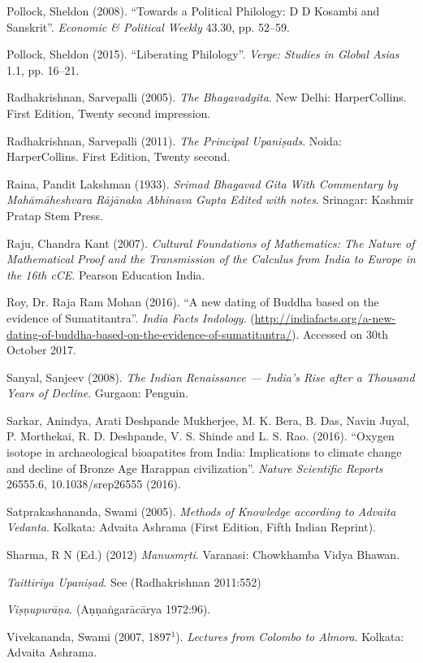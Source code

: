 \begin{thebibliography}{99}
Pollock, Sheldon (2008). ``Towards a Political Philology: D D Kosambi and Sanskrit''. {\sl Economic \& Political Weekly} 43.30, pp. 52--59.

Pollock, Sheldon  (2015). ``Liberating Philology''. {\sl Verge: Studies in Global Asias} 1.1, pp. 16--21.

Radhakrishnan, Sarvepalli (2005). {\sl The Bhagavadgita}. New Delhi: HarperCollins. First Edition, Twenty second impression.

Radhakrishnan, Sarvepalli (2011). {\sl The Principal Upaniṣads}. Noida: HarperCollins. First Edition, Twenty second.

Raina, Pandit Lakshman (1933). {\sl Srimad Bhagavad Gita With Commentary by Mahāmāheshvara Rājānaka Abhinava Gupta Edited with notes}. Srinagar: Kashmir Pratap Stem Press.

Raju, Chandra Kant (2007). {\sl Cultural Foundations of Mathematics: The Nature of Mathematical Proof and the Transmission of the Calculus from India to Europe in the 16th cCE}. Pearson Education India.

Roy, Dr. Raja Ram Mohan (2016). ``A new dating of Buddha based on the evidence of Sumatitantra''. {\sl India Facts Indology}.
(\url{http://indiafacts.org/a-new-dating-of-buddha-based-on-the-evidence-of-sumatitantra/}). Accessed on 30th October 2017. 

Sanyal, Sanjeev (2008). {\sl The Indian Renaissance --- India's Rise after a Thousand Years of Decline}. Gurgaon: Penguin.

Sarkar, Anindya, Arati Deshpande Mukherjee, M. K. Bera, B. Das, Navin Juyal, P. Morthekai, R. D. Deshpande, V. S. Shinde and L. S. Rao. (2016). ``Oxygen isotope in archaeological bioapatites from India: Implications to climate change and decline of Bronze Age Harappan civilization''. {\sl Nature Scientific Reports} 26555.6, 10.1038/srep26555 (2016).

Satprakashananda, Swami (2005). {\sl Methods of Knowledge according to Advaita Vedanta}. Kolkata: 
Advaita Ashrama (First Edition, Fifth Indian Reprint).

Sharma, R N (Ed.) (2012)  {\sl Manusmṛti}. Varanasi: Chowkhamba Vidya Bhawan.

{\sl Taittirīya Upaniṣad}. See (Radhakrishnan 2011:552)

{\sl Viṣṇupurāṇa}. (Aṇṇaṅgarācārya 1972:96).

Vivekananda, Swami (2007, 1897$^1$). {\sl Lectures from Colombo to Almora}. Kolkata: Advaita Ashrama.
\end{thebibliography}


\theendnotes
\label{chapter\thechapter:end}

